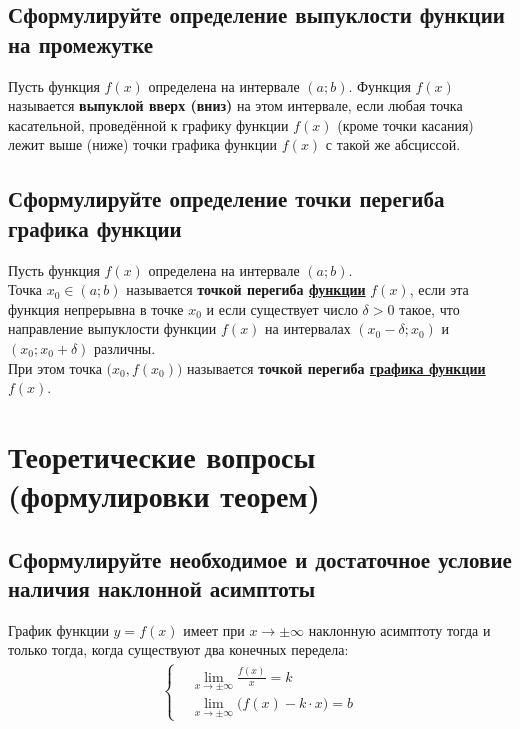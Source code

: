 \subsection{Сформулируйте определение выпуклости функции на промежутке}
\begin{definition}
    Пусть функция $f(x)$ определена на интервале $(a;b)$. Функция $f(x)$ называется \textbf{выпуклой вверх (вниз)} на этом интервале, если любая точка касательной, проведённой к графику функции $f(x)$ (кроме точки касания) лежит выше (ниже) точки графика функции $f(x)$ с такой же абсциссой.
\end{definition}

\subsection{Сформулируйте определение точки перегиба графика функции}
\begin{definition}
    Пусть функция $f(x)$ определена на интервале $(a;b)$.\\
    Точка $x_0 \in (a;b)$ называется \textbf{точкой перегиба \underline{функции}} $f(x)$, если эта функция непрерывна в точке $x_0$ и если существует число $\delta > 0$ такое, что направление выпуклости функции $f(x)$ на интервалах $(x_0 - \delta; x_0)$ и $(x_0; x_0 + \delta)$ различны.\\
    При этом точка $\big(x_0, f(x_0)\big)$ называется \textbf{точкой перегиба \underline{графика функции}} $f(x)$.
\end{definition}
\section{Теоретические вопросы (формулировки теорем)}

\subsection{Сформулируйте необходимое и достаточное условие наличия наклонной асимптоты}
\begin{theorem}
	График функции $y=f(x)$ имеет при $x\to \pm \infty$ наклонную асимптоту тогда и только тогда, когда существуют два конечных передела:
	\begin{gather*}
		\left\{ \begin{aligned}
			 & \lim\limits_{x \to \pm \infty} \frac{f(x)}{x} = k               \\
			 & \lim\limits_{x \to \pm \infty} \big(f(x) - k\cdot x\big) = b
		\end{aligned} \right.
	\end{gather*}
\end{theorem}

